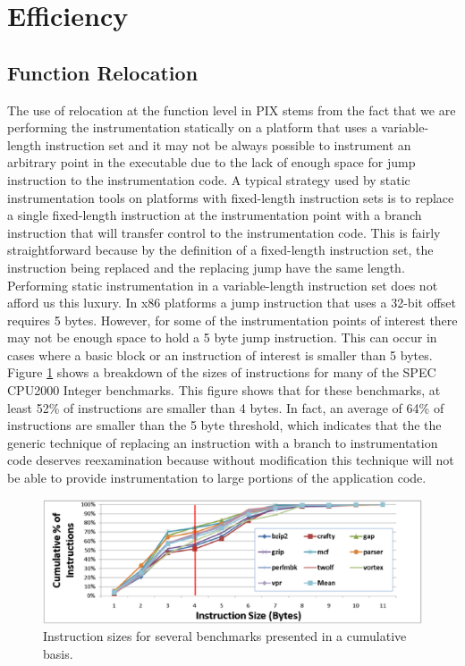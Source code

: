 \section{Efficiency}

\label{Subsection:Relocation}
\subsection{Function Relocation}
The use of relocation at the function level in PIX stems from the fact
that we are performing the instrumentation statically on a platform that uses a
variable-length instruction set and it may not be always possible to instrument
an arbitrary point in the executable due to the lack of enough space for jump instruction to the instrumentation code. 
A typical strategy used by static
instrumentation tools on platforms with fixed-length instruction sets is to
replace a single fixed-length instruction at the instrumentation point with a
branch instruction that will transfer control to the instrumentation code. This is fairly straightforward because by the
definition of a fixed-length instruction set, the instruction being replaced and
the replacing jump have the same length. Performing static instrumentation
in a variable-length instruction set does not afford us this luxury. In x86 platforms a
jump instruction that uses a 32-bit offset requires 5 bytes. However, for some of
the instrumentation points of interest there may not be enough space to hold a 5 byte
jump instruction. This can occur in cases where a basic block or an instruction of interest
is smaller than 5 bytes. Figure \ref{Figure:InstructionSizes} shows a breakdown of the sizes of
instructions for many of the SPEC CPU2000 Integer benchmarks. This figure shows that for these benchmarks,
at least 52\% of instructions are smaller than 4 bytes. In fact, an average of 64\% of instructions
are smaller than the 5 byte threshold, which indicates that the the generic technique of replacing 
an instruction with a branch to instrumentation code deserves reexamination because without modification
this technique will not be able to provide instrumentation to large portions of the application code.

\begin{figure}[ht]
\centering
\label{Figure:InstructionSizes}
\includegraphics[scale=0.5]{instsize.eps}
\caption{Instruction sizes for several benchmarks presented in a cumulative basis.}
\end{figure}

